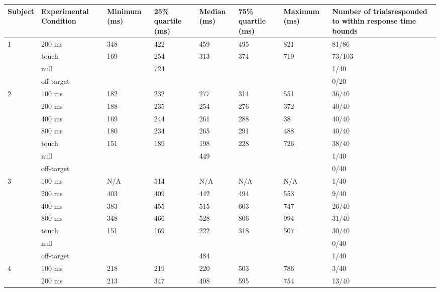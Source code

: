 \renewcommand{\tabcolsep}{1pt}
\renewcommand{\arraystretch}{0.7}
\begin{table}[ht]
	
	\scriptsize
	\begin{tabularx}{\textwidth}{@{}lXXXXXXX@{}}
		\toprule
		Subject & Experimental \newline Condition & Minimum \newline (ms) & 25\% quartile \newline (ms) & Median \newline (ms) & 75\% quartile \newline (ms)  & Maximum \newline(ms) & Number of trials\newline responded to within \newline response time bounds \\
		\midrule
		1 & 200 ms & 348 & 422 & 459 & 495 & 821 & 81/86 \\
		& touch & 169 & 254 & 313 & 374 & 719 & 73/103 \\
		& null &   & 724   &   &  &  & 1/40 \\
		& off-target & & & & & &  0/20 \\
		\midrule
		2 & 100 ms & 182 & 232 & 277 & 314 & 551 & 36/40 \\
		& 200 ms & 188 & 235 & 254 & 276 & 372 & 40/40 \\
		& 400 ms & 169 & 244 & 261 & 288 & 38 & 40/40 \\
		& 800 ms & 180 & 234 & 265 & 291 & 488 & 40/40 \\
		& touch & 151 & 189 & 198 & 228 & 726 & 38/40 \\
		& null & & & 449   &  & & 1/40 \\
		& off-target & & & & & &  0/40 \\
		\midrule
		3 & 100 ms & N/A & 514 & N/A & N/A & N/A & 1/40 \\
		& 200 ms & 403 & 409 & 442 & 494 & 553 & 9/40 \\
		& 400 ms & 383 & 455 & 515 & 603 & 747 & 26/40 \\
		& 800 ms & 348 & 466 & 528 & 806 & 994 & 31/40 \\
		& touch & 151 & 169 & 222 & 318 & 507 & 30/40 \\
		& null &   &   &   &   &  & 0/40 \\
		& off-target & & & 484  & & & 1/40 \\
		\midrule
		4 & 100 ms & 218 & 219 & 220 & 503 & 786 & 3/40 \\
		& 200 ms & 213 & 347 & 408 & 595 & 754 & 13/40 \\

\end{tabularx}
\end{table}
